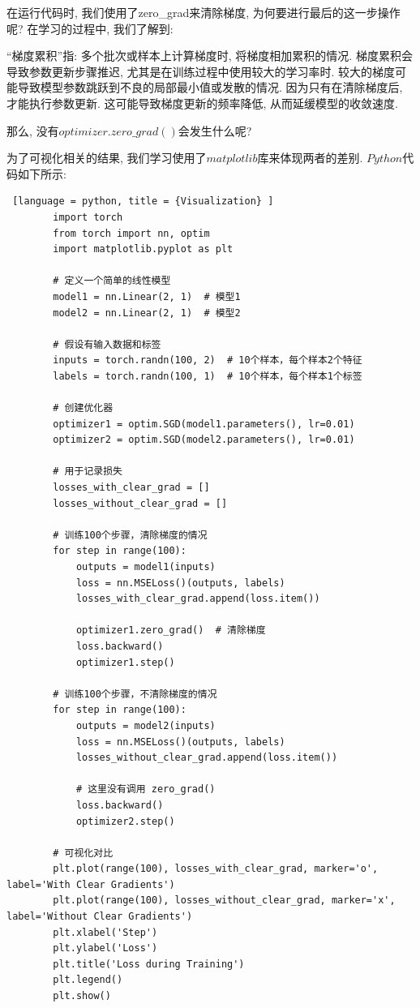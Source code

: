 \documentclass[printMode=true, declarePage=false]{ecnuthesis}
\begin{document}
    在运行代码时, 我们使用了zero\_grad来清除梯度, 为何要进行最后的这一步操作呢?
    在学习的过程中,
    我们了解到:

    ``梯度累积''指: 多个批次或样本上计算梯度时, 将梯度相加累积的情况.
    梯度累积会导致参数更新步骤推迟,
    尤其是在训练过程中使用较大的学习率时.
    较大的梯度可能导致模型参数跳跃到不良的局部最小值或发散的情况.
    因为只有在清除梯度后, 才能执行参数更新.
    这可能导致梯度更新的频率降低, 从而延缓模型的收敛速度.

    那么, 没有$optimizer.zero\_grad()$会发生什么呢?

    为了可视化相关的结果,
    我们学习使用了$matplotlib$库来体现两者的差别.
    $Python$代码如下所示:

    \begin{lstlisting} [language = python, title = {Visualization} ]
        import torch
        from torch import nn, optim
        import matplotlib.pyplot as plt

        # 定义一个简单的线性模型
        model1 = nn.Linear(2, 1)  # 模型1
        model2 = nn.Linear(2, 1)  # 模型2

        # 假设有输入数据和标签
        inputs = torch.randn(100, 2)  # 10个样本，每个样本2个特征
        labels = torch.randn(100, 1)  # 10个样本，每个样本1个标签

        # 创建优化器
        optimizer1 = optim.SGD(model1.parameters(), lr=0.01)
        optimizer2 = optim.SGD(model2.parameters(), lr=0.01)

        # 用于记录损失
        losses_with_clear_grad = []
        losses_without_clear_grad = []

        # 训练100个步骤，清除梯度的情况
        for step in range(100):
            outputs = model1(inputs)
            loss = nn.MSELoss()(outputs, labels)
            losses_with_clear_grad.append(loss.item())

            optimizer1.zero_grad()  # 清除梯度
            loss.backward()
            optimizer1.step()

        # 训练100个步骤，不清除梯度的情况
        for step in range(100):
            outputs = model2(inputs)
            loss = nn.MSELoss()(outputs, labels)
            losses_without_clear_grad.append(loss.item())

            # 这里没有调用 zero_grad()
            loss.backward()
            optimizer2.step()

        # 可视化对比
        plt.plot(range(100), losses_with_clear_grad, marker='o', label='With Clear Gradients')
        plt.plot(range(100), losses_without_clear_grad, marker='x', label='Without Clear Gradients')
        plt.xlabel('Step')
        plt.ylabel('Loss')
        plt.title('Loss during Training')
        plt.legend()
        plt.show()
    \end{lstlisting}
\end{document}
